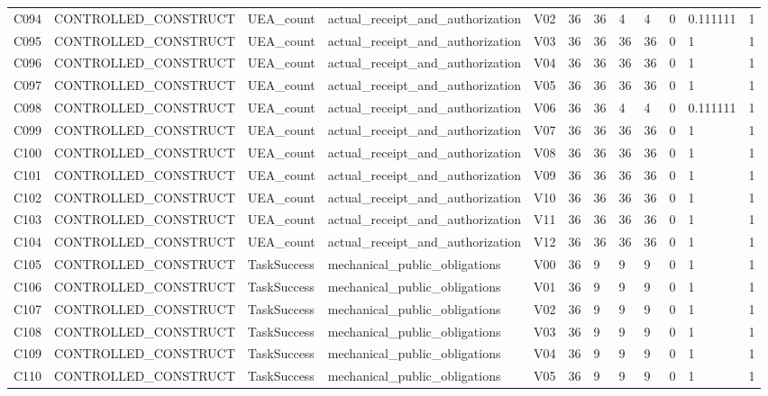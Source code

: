 \begin{longtable}{llllllllllll}
C094 & CONTROLLED\_CONSTRUCT & UEA\_count & actual\_receipt\_and\_authorization & V02 & 36 & 36 & 4 & 4 & 0 & 0.111111 & 1 \\
C095 & CONTROLLED\_CONSTRUCT & UEA\_count & actual\_receipt\_and\_authorization & V03 & 36 & 36 & 36 & 36 & 0 & 1 & 1 \\
C096 & CONTROLLED\_CONSTRUCT & UEA\_count & actual\_receipt\_and\_authorization & V04 & 36 & 36 & 36 & 36 & 0 & 1 & 1 \\
C097 & CONTROLLED\_CONSTRUCT & UEA\_count & actual\_receipt\_and\_authorization & V05 & 36 & 36 & 36 & 36 & 0 & 1 & 1 \\
C098 & CONTROLLED\_CONSTRUCT & UEA\_count & actual\_receipt\_and\_authorization & V06 & 36 & 36 & 4 & 4 & 0 & 0.111111 & 1 \\
C099 & CONTROLLED\_CONSTRUCT & UEA\_count & actual\_receipt\_and\_authorization & V07 & 36 & 36 & 36 & 36 & 0 & 1 & 1 \\
C100 & CONTROLLED\_CONSTRUCT & UEA\_count & actual\_receipt\_and\_authorization & V08 & 36 & 36 & 36 & 36 & 0 & 1 & 1 \\
C101 & CONTROLLED\_CONSTRUCT & UEA\_count & actual\_receipt\_and\_authorization & V09 & 36 & 36 & 36 & 36 & 0 & 1 & 1 \\
C102 & CONTROLLED\_CONSTRUCT & UEA\_count & actual\_receipt\_and\_authorization & V10 & 36 & 36 & 36 & 36 & 0 & 1 & 1 \\
C103 & CONTROLLED\_CONSTRUCT & UEA\_count & actual\_receipt\_and\_authorization & V11 & 36 & 36 & 36 & 36 & 0 & 1 & 1 \\
C104 & CONTROLLED\_CONSTRUCT & UEA\_count & actual\_receipt\_and\_authorization & V12 & 36 & 36 & 36 & 36 & 0 & 1 & 1 \\
C105 & CONTROLLED\_CONSTRUCT & TaskSuccess & mechanical\_public\_obligations & V00 & 36 & 9 & 9 & 9 & 0 & 1 & 1 \\
C106 & CONTROLLED\_CONSTRUCT & TaskSuccess & mechanical\_public\_obligations & V01 & 36 & 9 & 9 & 9 & 0 & 1 & 1 \\
C107 & CONTROLLED\_CONSTRUCT & TaskSuccess & mechanical\_public\_obligations & V02 & 36 & 9 & 9 & 9 & 0 & 1 & 1 \\
C108 & CONTROLLED\_CONSTRUCT & TaskSuccess & mechanical\_public\_obligations & V03 & 36 & 9 & 9 & 9 & 0 & 1 & 1 \\
C109 & CONTROLLED\_CONSTRUCT & TaskSuccess & mechanical\_public\_obligations & V04 & 36 & 9 & 9 & 9 & 0 & 1 & 1 \\
C110 & CONTROLLED\_CONSTRUCT & TaskSuccess & mechanical\_public\_obligations & V05 & 36 & 9 & 9 & 9 & 0 & 1 & 1 \\

\end{longtable}
